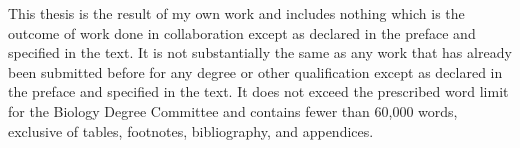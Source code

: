 
\begin{declaration}

This thesis is the result of my own work and includes nothing which is the outcome of work done in collaboration except as declared in the preface and specified in the text. It is not substantially the same as any work that has already been submitted before for any degree or other qualification except as declared in the preface and specified in the text. It does not exceed the prescribed word limit for the Biology Degree Committee and contains fewer than 60,000 words, exclusive of tables, footnotes, bibliography, and appendices. 



\end{declaration}